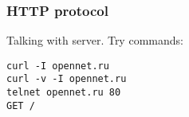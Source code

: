 \begin{frame}[fragile]
\frametitle{HTTP protocol}
Talking with server. Try commands:
\begin{lstlisting}
curl -I opennet.ru
curl -v -I opennet.ru
telnet opennet.ru 80
GET /
\end{lstlisting}
\end{frame}
